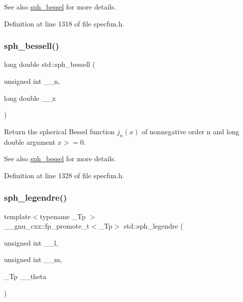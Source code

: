 \begin{DoxySeeAlso}{See also}
\hyperlink{group__mathsf__std_gad125841d7c85e461cb8954952e3a17c8}{sph\+\_\+bessel} for more details. 
\end{DoxySeeAlso}


Definition at line 1318 of file specfun.\+h.

\mbox{\label{group__mathsf__std_ga11d72b1af81ce9da3c878a25087ee927}} 
\subsubsection{\texorpdfstring{sph\+\_\+bessell()}{sph\_bessell()}}
{\footnotesize\ttfamily long double std\+::sph\+\_\+bessell (\begin{DoxyParamCaption}\item[{unsigned int}]{\+\_\+\+\_\+n,  }\item[{long double}]{\+\_\+\+\_\+x }\end{DoxyParamCaption})\hspace{0.3cm}{\ttfamily [inline]}}

Return the spherical Bessel function $ j_n(x) $ of nonnegative order n and {\ttfamily long double} argument $ x >= 0 $.

\begin{DoxySeeAlso}{See also}
\hyperlink{group__mathsf__std_gad125841d7c85e461cb8954952e3a17c8}{sph\+\_\+bessel} for more details. 
\end{DoxySeeAlso}


Definition at line 1328 of file specfun.\+h.

\mbox{\label{group__mathsf__std_gacef0d41a7ce572a9ace3437498794ed0}} 
\subsubsection{\texorpdfstring{sph\+\_\+legendre()}{sph\_legendre()}}
{\footnotesize\ttfamily template$<$typename \+\_\+\+Tp $>$ \\
\+\_\+\+\_\+gnu\+\_\+cxx\+::fp\+\_\+promote\+\_\+t$<$\+\_\+\+Tp$>$ std\+::sph\+\_\+legendre (\begin{DoxyParamCaption}\item[{unsigned int}]{\+\_\+\+\_\+l,  }\item[{unsigned int}]{\+\_\+\+\_\+m,  }\item[{\+\_\+\+Tp}]{\+\_\+\+\_\+theta }\end{DoxyParamCaption})\hspace{0.3cm}{\ttfamily [inline]}}

